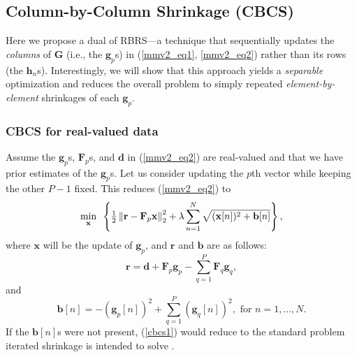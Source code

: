 \documentclass[final]{siamltex}
\newcommand{\la}[1]{\mbox{$\mathbf{#1}$}}  \newcommand{\sst}[1]{\mbox{\scriptsize{#1}}}
\begin{document}
\subsection{Column-by-Column Shrinkage (CBCS)}

    Here we propose a dual of RBRS---a technique that sequentially
    updates the {\em{columns}} of $\la{G}$ (i.e., the $\la{g}_p$s) in
    (\ref{mmv2_eq1}, \ref{mmv2_eq2}) rather than its rows (the
    $\la{h}_n$s).  Interestingly, we will show that this approach
    yields a {\em{separable}} optimization and reduces the overall
    problem to simply repeated {\em{element-by-element}} shrinkages of
    each $\la{g}_p$.

    \subsubsection{CBCS for real-valued data} Assume the $\la{g}_p$s,
    $\la{F}_p$s, and $\la{d}$ in (\ref{mmv2_eq2}) are real-valued and
    that we have prior estimates of the $\la{g}_p$s.  Let us consider
    updating the $p$th vector while keeping the other $P - 1$ fixed.
    This reduces (\ref{mmv2_eq2}) to
    \begin{equation}\label{cbcs1}
      \mathop{\mbox{min}}_{\mbox{\scriptsize{$\la{x}$}}}
      \mbox{  }
       \left  \{ \tfrac{1}{2}
                 \left \Vert \la{r} - \la{F}_p \la{x}     \right \Vert_2^2 +
         \lambda \sum_{n=1}^{N} \sqrt{ (\la{x}[n])^2 + \la{b}[n] }
       \right \},
    \end{equation}
    where $\la{x}$ will be the update of $\la{g}_p$, and \la{r} and \la{b} are as follows:
    \begin{equation}\label{cbcs_extra1}
       \la{r} = \la{d} + \la{F}_p \la{g}_p - \sum_{q=1}^{P} \la{F}_q \la{g}_q,
    \end{equation}
    and
    \begin{equation}\label{cbcs_extra2}
       \la{b}[n] = -(\la{g}_p[n])^2 + \sum_{q=1}^{P} (\la{g}_q[n])^2, \mbox{ for } n = 1, \ldots, N.
    \end{equation}
    If the $\la{b}[n]$s were not present, (\ref{cbcs1}) would reduce to the
    standard problem iterated shrinkage is intended to solve
    \cite{Ela2006_TransIT,Ela2006}.
\end{document}
